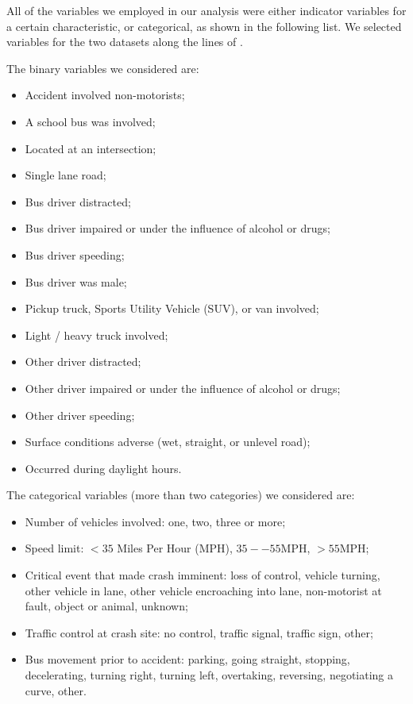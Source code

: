 All of the variables we employed in our analysis were either indicator
variables for a certain characteristic, or categorical, as shown in
the following list. We selected variables for the two datasets along
the lines of \cite{prato2013bus}.

The binary variables we considered are:
  \begin{itemize}
  \item Accident involved non-motorists;
  \item A school bus was involved;
  \item Located at an intersection;
  \item Single lane road;
  \item Bus driver distracted;
  \item Bus driver impaired or under the influence of alcohol or drugs;
  \item Bus driver speeding;
  \item Bus driver was male;
  \item Pickup truck, Sports Utility Vehicle (SUV), or van involved;
  \item Light / heavy truck involved;
  \item Other driver distracted;
  \item Other driver impaired or under the influence of alcohol or drugs;
  \item Other driver speeding;
  \item Surface conditions adverse (wet, straight, or unlevel road);
  \item Occurred during daylight hours.
  \end{itemize}
  
The categorical variables (more than two categories) we considered are:
  \begin{itemize}
  \item Number of vehicles involved: one, two, three or more;
  \item Speed limit: $<35$ Miles Per Hour (MPH), $35--55$MPH, $>55$MPH;
  \item Critical event that made crash imminent: loss of control,
    vehicle turning, other vehicle in lane, other vehicle encroaching into lane, non-motorist at fault, object or animal, unknown;
  \item Traffic control at crash site: no control, traffic signal,
    traffic sign, other;
  \item Bus movement prior to accident: parking, going straight,
    stopping, decelerating, turning right, turning left, overtaking,
    reversing, negotiating a curve, other.
  \end{itemize}